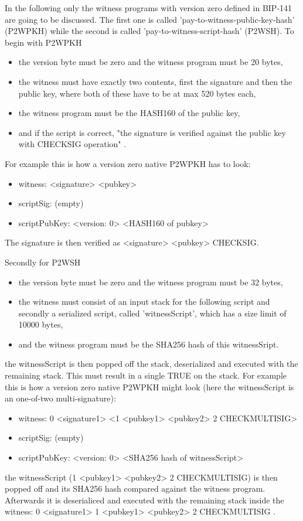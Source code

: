 In the following only the witness programs with version zero defined in BIP-141 are going to be discussed. The first one is called 'pay-to-witness-public-key-hash' (P2WPKH) while the second is called 'pay-to-witness-script-hash' (P2WSH). To begin with P2WPKH
\begin{itemize}
    \item the version byte must be zero and the witness program must be 20 bytes,
    \item the witness must have exactly two contents, first the signature and then the public key, where both of these have to be at max 520 bytes each,
    \item the witness program must be the HASH160 of the public key,
    \item and if the script is correct, "the signature is verified against the public key with CHECKSIG operation" \cite{bip-141}.
\end{itemize}

For example this is how a version zero native P2WPKH has to look:
\begin{itemize}
    \item witness: <signature> <pubkey>
    \item scriptSig: (empty)
    \item scriptPubKey: <version: 0> <HASH160 of pubkey> \cite{bip-141}
\end{itemize}
The signature is then verified as <signature> <pubkey> CHECKSIG.

Secondly for P2WSH
\begin{itemize}
    \item the version byte must be zero and the witness program must be 32 bytes,
    \item the witness must consist of an input stack for the following script and secondly a serialized script, called 'witnessScript', which has a size limit of 10000 bytes,
    \item and the witness program must be the SHA256 hash of this witnessSript.
\end{itemize}
the witnessScript is then popped off the stack, deserialized and executed with the remaining stack. This must result in a single TRUE on the stack. For example this is how a version zero native P2WPKH might look (here the witnessScript is an one-of-two multi-signature):
\begin{itemize}
    \item witness: 0 <signature1> <1 <pubkey1> <pubkey2> 2 CHECKMULTISIG>
    \item scriptSig: (empty)
    \item scriptPubKey: <version: 0> <SHA256 hash of witnessScript> \cite{bip-141}
\end{itemize}
the witnessScript (1 <pubkey1> <pubkey2> 2 CHECKMULTISIG) is then popped off and its SHA256 hash compared against the witness program. Afterwards it is deserialiced and executed with the remaining stack inside the witness: 0 <signature1> 1 <pubkey1> <pubkey2> 2 CHECKMULTISIG \cite{bip-141}.

